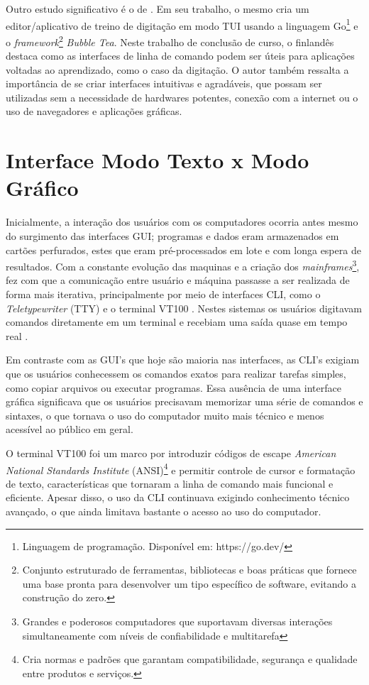 Outro estudo significativo é o de . Em seu trabalho, o mesmo cria
um editor/aplicativo de treino de digitação em modo TUI usando a
linguagem Go\footnote{Linguagem de programação. Disponível em: https://go.dev/} e
o \textit{framework}\footnote{Conjunto estruturado de ferramentas, bibliotecas e
boas práticas que fornece uma base pronta para desenvolver um tipo específico de
software, evitando a construção do zero.} \textit{Bubble Tea}. Neste trabalho
de conclusão de curso, o finlandês destaca como as interfaces de linha de
comando podem ser úteis para aplicações voltadas ao aprendizado, como o caso da digitação.
O autor também ressalta a importância de se criar interfaces intuitivas e
agradáveis, que possam ser utilizadas sem a necessidade de hardwares
potentes, conexão com a internet ou o uso de navegadores e aplicações gráficas.

\section{Interface Modo Texto x Modo Gráfico}

Inicialmente, a interação dos usuários com os computadores ocorria antes mesmo do surgimento das interfaces GUI;
programas e dados eram armazenados em cartões perfurados, estes que eram pré-processados em lote e com longa
espera de resultados. Com a constante evolução das maquinas e a criação dos
\textit{mainframes}\footnote{Grandes e poderosos computadores que suportavam
diversas interações simultaneamente com níveis de confiabilidade e multitarefa},
fez com que a comunicação entre usuário e máquina passasse a ser realizada de forma
mais iterativa, principalmente por meio de interfaces CLI,
como o \textit{Teletypewriter} (TTY) \cite{ColumbiaTeletype2023} e o terminal
VT100 \cite{DEC_VT100}. Nestes sistemas os usuários digitavam comandos diretamente
em um terminal e recebiam uma saída quase em tempo real \cite{ComputerHistoryMuseum}.

Em contraste com as GUI’s que hoje são maioria nas interfaces, as CLI's
exigiam que os usuários conhecessem os comandos exatos para
realizar tarefas simples, como copiar arquivos ou executar programas. Essa
ausência de uma interface gráfica significava que os usuários precisavam
memorizar uma série de comandos e sintaxes, o que tornava o uso do computador muito
mais técnico e menos acessível ao público em geral.

O terminal VT100 foi um marco por introduzir códigos de escape \textit{American National Standards Institute}
(ANSI)\footnote{Cria normas e padrões que garantam compatibilidade, segurança e qualidade entre produtos
e serviços.} e permitir controle de cursor e formatação de texto, características que tornaram a linha de comando
mais funcional e eficiente. Apesar disso, o uso da CLI continuava exigindo
conhecimento técnico avançado, o que ainda limitava bastante o acesso ao uso do computador.

